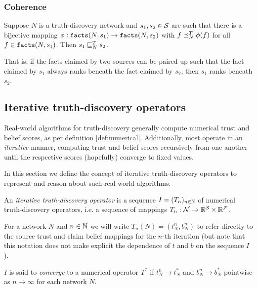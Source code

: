 \documentclass[../main.tex]{subfiles}
\begin{document}
\subsubsection{Coherence}


\begin{axiom}[Coherence]
Suppose $N$ is a truth-discovery network and $s_1, s_2 \in \S$ are such that
there is a bijective mapping $\phi: \fact(N, s_1) \rightarrow \fact(N, s_2)$
with $f \fle_N^T \phi(f)$ for all $f \in \fact(N, s_1)$. Then $s_1 \sle_N^T
s_2$.


That is, if the facts claimed by two sources can be paired up such that the
fact claimed by $s_1$ always ranks beneath the fact claimed by $s_2$, then
$s_1$ ranks beneath $s_2$.
\end{axiom}

\subsection{Iterative truth-discovery operators}

Real-world algorithms for truth-discovery generally compute numerical trust and
belief scores, as per definition \ref{def:numerical}. Additionally, most
operate in an \emph{iterative} manner, computing trust and belief scores
recursively from one another until the respective scores (hopefully) converge
to fixed values.

In this section we define the concept of iterative truth-discovery operators to
represent and reason about such real-world algorithms.

\begin{definition}
\label{def:iterative_operator}

An \emph{iterative truth-discovery operator} is a sequence $I=(T_n)_{n \in
\Nat}$ of numerical truth-discovery operators, i.e. a sequence of mappings $T_n
: \N \rightarrow \R^\S \times \R^\F$.

For a network $N$ and $n \in \Nat$ we will write $T_n(N) = (t_N^n, b_N^n)$ to
refer directly to the source trust and claim belief mappings for the $n$-th
iteration (but note that this notation does not make explicit the dependence of
$t$ and $b$ on the sequence $I$).

$I$ is said to \emph{converge} to a numerical operator $T^*$ if $t_N^n
\rightarrow t_N^*$ and $b_N^n \rightarrow b_N^*$ pointwise as $n \rightarrow
\infty$ for each network $N$.

\end{definition}
\end{document}
